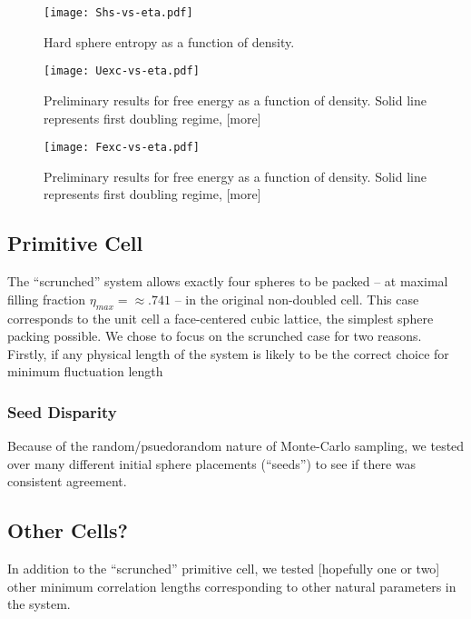 \documentclass[12pt]{article}
\newcommand{\ignore}[1]{}
\begin{document}
\begin{figure}
\centering
    \texttt{[image: Shs-vs-eta.pdf]}
    \caption{Hard sphere entropy as a function of density.}
    \label{Shs-eta}
\end{figure}
\ignore{Filling fraction or density? Value in distinction? We never use number density for the sake of units...}


\begin{figure}
    \centering
    \texttt{[image: Uexc-vs-eta.pdf]}
    \caption{Preliminary results for free energy as a function of density. Solid line represents first doubling regime, [more]}
    \label{U-eta}
\end{figure}


\begin{figure}
\centering
    \texttt{[image: Fexc-vs-eta.pdf]}
    \caption{Preliminary results for free energy as a function of density. Solid line represents first doubling regime, [more]}
    \label{F-eta}
\end{figure}

\subsection{Primitive Cell}
The ``scrunched'' system allows exactly four spheres to be packed -- at maximal filling fraction $\eta_{max} = \approx .741$ -- in the original non-doubled cell. This case corresponds to the unit cell a face-centered cubic lattice, the simplest sphere packing possible. We chose to focus on the scrunched case for two reasons. Firstly, if any physical length of the system is likely to be the correct choice for minimum fluctuation length 

\subsubsection{Seed Disparity}
Because of the random/psuedorandom nature of Monte-Carlo sampling, we tested over many different initial sphere placements (``seeds'') to see if there was consistent agreement. 
\subsection{Other Cells?}
In addition to the ``scrunched'' primitive cell, we tested [hopefully one or two] other minimum correlation lengths corresponding to other natural parameters in the system.

\end{document}
